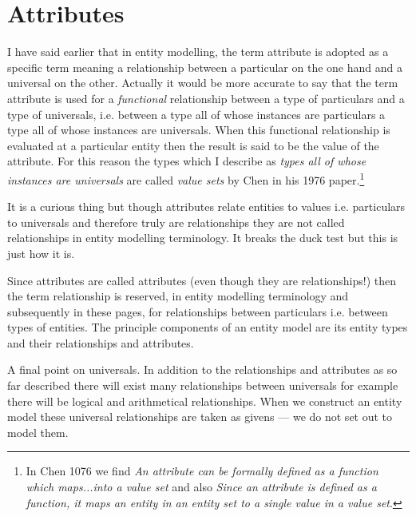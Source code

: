 

\section{Attributes}
\label{Attributes}
\mynote I have said earlier that in entity modelling, the term attribute is adopted as a specific term meaning a relationship between a particular on the one hand and a universal on the other. Actually it would be more accurate to say that the term attribute is used for a \textit{functional} relationship between a type of particulars and a type of universals,
 i.e. between a type all of whose instances are particulars a type all of whose instances are universals.
When this functional relationship is evaluated at a particular entity then the result is said to be the value of the attribute. For this reason the types which I describe as \textit{types all of whose instances are universals} are called \textit{value sets} by Chen in his  1976 paper.\footnote{
In Chen 1076 we find \textit{An attribute can be formally defined as a function which maps...into a value set} and also \textit{Since an attribute is defined as a function, it maps an entity in an entity set to a single value in a value set}.} 

\mynote
 It is a curious thing but though attributes relate entities to  values i.e. particulars to universals
 and therefore truly are relationships they are not called relationships in entity modelling terminology. It breaks the duck test but this is just how it is. 

\mynote Since attributes are called attributes (even though they are relationships!) then the term relationship is reserved, in entity modelling terminology and subsequently in these pages, for relationships between particulars i.e. between types of entities. 
 The principle components of an entity model are its entity types and their relationships and attributes.

\mynote A final point on universals. In addition to the relationships and attributes as so far described there will exist many relationships between universals 
for example there will be logical and arithmetical relationships. When we construct an entity model these universal relationships are taken as givens --- we do not set out to model them.


